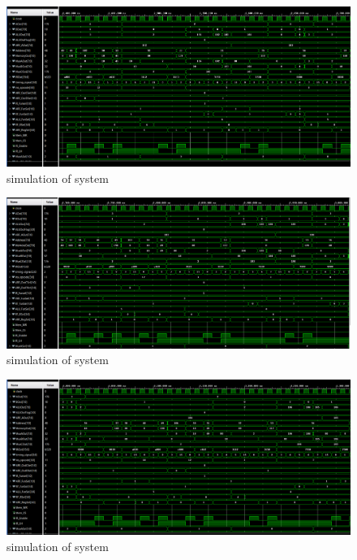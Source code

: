 \documentclass[pdftex,12pt,a4paper]{article}
\begin{document}
\begin{figure}[H]
    \centering
    \includegraphics[width=1\textwidth]{photos/system_result_9.png}	
    \caption{simulation of system}
    \label{implementation}
\end{figure}

\begin{figure}[H]
    \centering
    \includegraphics[width=1\textwidth]{photos/system_result_10.png}	
    \caption{simulation of system}
    \label{implementation}
\end{figure}

\begin{figure}[H]
    \centering
    \includegraphics[width=1\textwidth]{photos/system_result_11.png}	
    \caption{simulation of system}
    \label{implementation}
\end{figure}
\end{document}
